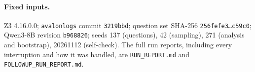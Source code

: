 \documentclass[runningheads]{llncs}
\begin{document}
\paragraph{Fixed inputs.} Z3 4.16.0.0; \texttt{avalonlogs} commit \texttt{3219bbd}; question set
SHA-256 \texttt{256fefe3\ldots c59c0}; Qwen3-8B revision \texttt{b968826}; seeds 137 (questions), 42 (sampling),
271 (analysis and bootstrap), 20261112 (self-check). The full run reports, including every interruption and how it
was handled, are \texttt{RUN\_REPORT.md} and \texttt{FOLLOWUP\_RUN\_REPORT.md}.
\end{document}
